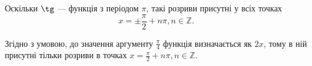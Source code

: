 \documentclass[../rgr1.tex]{subfiles}
\begin{document}



Оскільки $\tg$ --- функція з періодом $\pi$,
такі розриви присутні у всіх точках
$$
x = \pm \frac{\pi}{2} + n\pi, n \in \mathbb Z.
$$

Згідно з умовою, до значення аргументу $\frac{\pi}{4}$ функція
визначається як $2x$, тому в ній присутні тільки розриви в точках
$x = \frac{\pi}{2} + n\pi, n \in \mathbb Z.$


\end{document}
